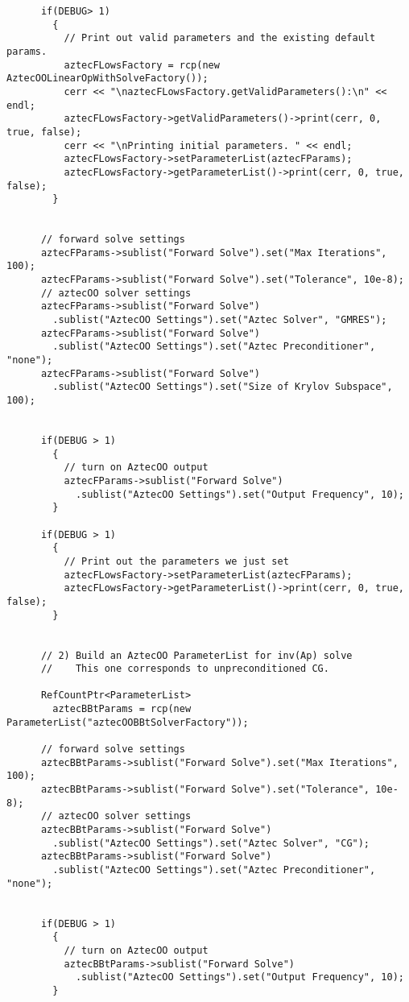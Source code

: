 \documentclass[oneeqnum,onefignum,onetabnum,10pt]{SANDreport}
\begin{document}
\begin{verbatim}
      if(DEBUG> 1)
        {
          // Print out valid parameters and the existing default params.
          aztecFLowsFactory = rcp(new AztecOOLinearOpWithSolveFactory());
          cerr << "\naztecFLowsFactory.getValidParameters():\n" << endl;
          aztecFLowsFactory->getValidParameters()->print(cerr, 0, true, false);
          cerr << "\nPrinting initial parameters. " << endl;
          aztecFLowsFactory->setParameterList(aztecFParams);
          aztecFLowsFactory->getParameterList()->print(cerr, 0, true, false);
        }


      // forward solve settings
      aztecFParams->sublist("Forward Solve").set("Max Iterations", 100);
      aztecFParams->sublist("Forward Solve").set("Tolerance", 10e-8);
      // aztecOO solver settings
      aztecFParams->sublist("Forward Solve")
        .sublist("AztecOO Settings").set("Aztec Solver", "GMRES");
      aztecFParams->sublist("Forward Solve")
        .sublist("AztecOO Settings").set("Aztec Preconditioner", "none");
      aztecFParams->sublist("Forward Solve")
        .sublist("AztecOO Settings").set("Size of Krylov Subspace", 100);


      if(DEBUG > 1)
        {
          // turn on AztecOO output
          aztecFParams->sublist("Forward Solve")
            .sublist("AztecOO Settings").set("Output Frequency", 10);
        }

      if(DEBUG > 1)
        {
          // Print out the parameters we just set
          aztecFLowsFactory->setParameterList(aztecFParams);
          aztecFLowsFactory->getParameterList()->print(cerr, 0, true, false);
        }


      // 2) Build an AztecOO ParameterList for inv(Ap) solve
      //    This one corresponds to unpreconditioned CG.

      RefCountPtr<ParameterList>
        aztecBBtParams = rcp(new ParameterList("aztecOOBBtSolverFactory"));

      // forward solve settings
      aztecBBtParams->sublist("Forward Solve").set("Max Iterations", 100);
      aztecBBtParams->sublist("Forward Solve").set("Tolerance", 10e-8);
      // aztecOO solver settings
      aztecBBtParams->sublist("Forward Solve")
        .sublist("AztecOO Settings").set("Aztec Solver", "CG");
      aztecBBtParams->sublist("Forward Solve")
        .sublist("AztecOO Settings").set("Aztec Preconditioner", "none");


      if(DEBUG > 1)
        {
          // turn on AztecOO output
          aztecBBtParams->sublist("Forward Solve")
            .sublist("AztecOO Settings").set("Output Frequency", 10);
        }



\end{verbatim}
\end{document}
